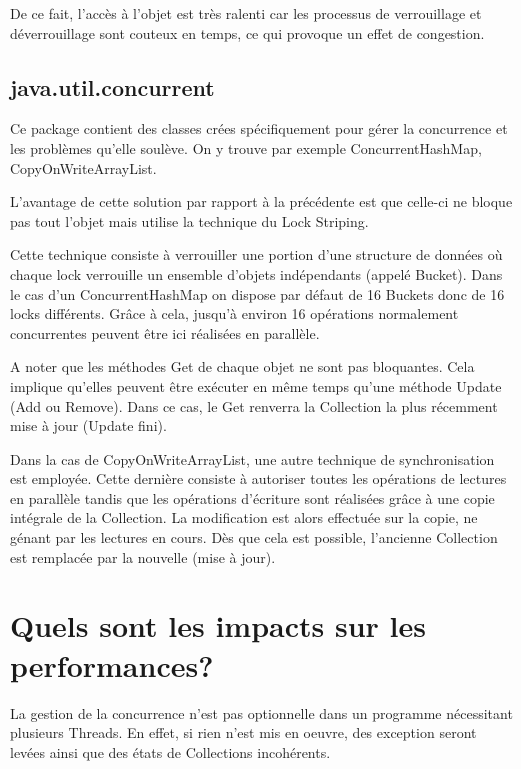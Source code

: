 \documentclass{report}
\begin{document}

			De ce fait, l'accès à l'objet est très ralenti car les processus de verrouillage et déverrouillage sont couteux en temps, ce qui provoque un effet de congestion.		

		\section{java.util.concurrent}

			Ce package contient des classes crées spécifiquement pour gérer la concurrence et les problèmes qu'elle soulève.
			On y trouve par exemple ConcurrentHashMap, CopyOnWriteArrayList.

			L'avantage de cette solution par rapport à la précédente est que celle-ci ne bloque pas tout l'objet mais utilise la technique du Lock Striping.


			Cette technique consiste à verrouiller une portion d'une structure de données où chaque lock verrouille un ensemble d'objets indépendants (appelé Bucket).
			Dans le cas d'un ConcurrentHashMap on dispose par défaut de 16 Buckets donc de 16 locks différents.
			Grâce à cela, jusqu'à environ 16 opérations normalement concurrentes peuvent être ici réalisées en parallèle.

			A noter que les méthodes Get de chaque objet ne sont pas bloquantes.
			Cela implique qu'elles peuvent être exécuter en même temps qu'une méthode Update (Add ou Remove).
			Dans ce cas, le Get renverra la Collection la plus récemment mise à jour (Update fini).
			

			Dans la cas de CopyOnWriteArrayList, une autre technique de synchronisation est employée.
			Cette dernière consiste à autoriser toutes les opérations de lectures en parallèle tandis que les opérations d'écriture sont réalisées grâce à une copie intégrale de la Collection.
			La modification est alors effectuée sur la copie, ne génant par les lectures en cours. Dès que cela est possible, l'ancienne Collection est remplacée par la nouvelle (mise à jour).

	\chapter{Quels sont les impacts sur les performances?}

		La gestion de la concurrence n'est pas optionnelle dans un programme nécessitant plusieurs Threads. En effet, si rien n'est mis en oeuvre, des exception seront levées ainsi que des états de Collections incohérents. \\
\end{document}

